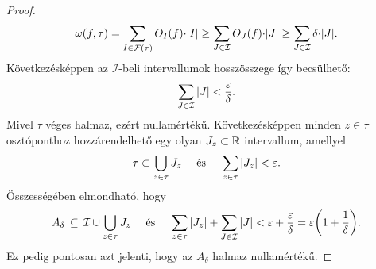 \documentclass[
]{elteikthesis}[2024/04/26]
\begin{document}
\begin{proof}
\[			\omega(f, \tau) =
			\sum_{I \in \mathcal{F}(\tau)} O_I(f) {\cdot} \abs{I} \geq
			\sum_{J \in \mathcal{I}} O_J(f) {\cdot} \abs{J} \geq
			\sum_{J \in \mathcal{I}} \delta {\cdot} \abs{J}.
		\]
		Következésképpen az \( \mathcal{I} \)-beli intervallumok hosszösszege így becsülhető:
		\[
			\sum_{J \in \mathcal{I}} \abs{J} < \frac{\varepsilon}{\delta}.
		\]
		Mivel \( \tau \) véges halmaz, ezért nullamértékű. 
		Következésképpen minden \( z \in \tau \) osztóponthoz hozzárendelhető 
		egy olyan \( J_z \subset \mathbb{R} \) intervallum, amellyel
		\[
			\tau \subset \bigcup_{z \in \tau} J_z
			\quad \text{ és } \quad
			\sum_{z \in \tau} \abs{J_z} < \varepsilon.
		\]
		Összességében elmondható, hogy
		\[
			A_\delta \,\subseteq\,
			\mathcal{I} \cup
			\bigcup_{z \in \tau} J_z
			\quad \text{ és } \quad
			\sum_{z \in \tau} \abs{J_z} + \sum_{J \in \mathcal{I}} \abs{J} <
			\varepsilon + \frac{\varepsilon}{\delta} =
			\varepsilon \biggl( 1 + \frac{1}{\delta} \biggr).
		\]
		Ez pedig pontosan azt jelenti, hogy az \( A_\delta \) halmaz nullamértékű.
		
		\newpage
		

\end{proof}
\end{document}
